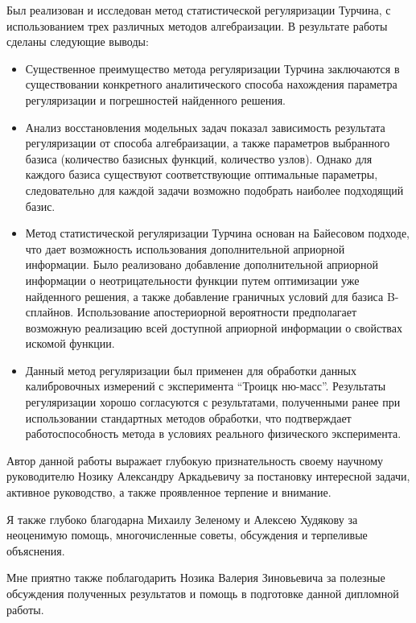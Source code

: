 
Был реализован и исследован метод статистической регуляризации Турчина, с использованием трех различных методов алгебраизации. В результате работы сделаны следующие выводы: 
\begin{itemize}
\item Существенное преимущество метода регуляризации Турчина заключаются в существовании конкретного аналитического способа нахождения параметра регуляризации и погрешностей найденного решения.
 
\item Анализ восстановления модельных задач показал зависимость результата регуляризации от способа алгебраизации, а также параметров выбранного базиса (количество базисных функций, количество узлов). Однако для каждого базиса существуют соответствующие оптимальные параметры, следовательно для каждой задачи возможно подобрать наиболее подходящий базис.

\item Метод статистической регуляризации Турчина основан на Байесовом подходе, что дает возможность использования дополнительной априорной информации. Было реализовано добавление дополнительной априорной информации о неотрицательности функции путем оптимизации уже найденного решения, а также добавление граничных условий для базиса B-сплайнов. Использование апостериорной вероятности предполагает возможную реализацию всей доступной априорной информации о свойствах искомой функции.

\item Данный метод регуляризации был применен для обработки данных калибровочных измерений с эксперимента ``Троицк ню-масс''. Результаты регуляризации хорошо согласуются с результатами, полученными ранее при использовании стандартных методов обработки, что подтверждает работоспособность метода в условиях реального физического эксперимента.
 \end{itemize}
 
\hfill \break
\hfill \break

Автор данной работы выражает глубокую признательность своему научному руководителю Нозику Александру Аркадьевичу за постановку интересной задачи, активное руководство, а также проявленное терпение и внимание. 

Я также глубоко благодарна Михаилу Зеленому и Алексею Худякову за неоценимую помощь, многочисленные советы, обсуждения и терпеливые объяснения.

Мне приятно также поблагодарить Нозика Валерия Зиновьевича за полезные обсуждения полученных результатов и помощь в подготовке данной дипломной работы.
 
 